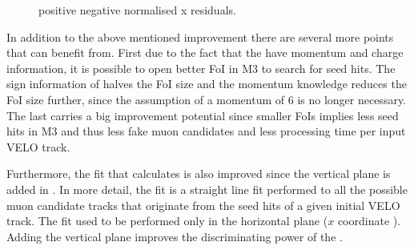 \begin{figure}[h]
  \centering
  \begin{subfigure}{0.5\textwidth}
    \scalebox{.6}{}
    \caption{}
    \label{mvTTm_pos_neg_x_norm}
  \end{subfigure}%
  \hfill%
  \begin{subfigure}{0.5\textwidth}
    \scalebox{.6}{}
    \caption{}
    \label{mvm_pos_neg_x_norm}
  \end{subfigure}
  \caption{positive negative normalised x residuals. }
 \label{mvm_pos_neg_x_norm_comp}
\end{figure}



In addition to the above mentioned improvement there are several more points that \mvm can benefit from.
First due to the fact that the \veloTTCand have momentum and charge information, it is possible to open better
FoI in M3 to search for seed hits. The sign information of \veloTTCand halves the FoI size
and the momentum knowledge reduces the FoI size further, since the assumption of a momentum of 6 \mev
is no longer necessary. The last carries a big improvement potential
since smaller FoIs implies less seed hits in M3 and thus less fake muon candidates and less processing time per input VELO track.

Furthermore, the \chisq fit that \mvm calculates is also improved since the vertical plane is added in \mvTTm. In more detail, the \chisq fit is a straight line fit
performed to all the possible muon candidate tracks that originate from the seed hits of a given initial VELO track. The fit used to be performed only in the horizontal
plane ($x$ coordinate ). Adding the vertical plane improves the discriminating power of the \chisq.

